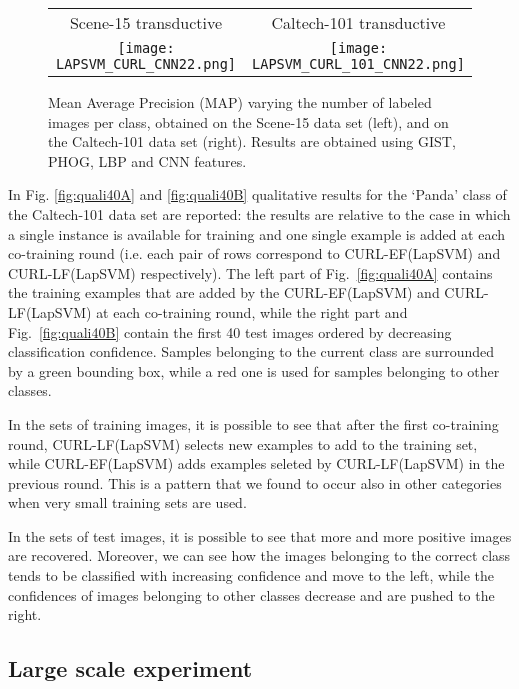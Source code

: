 \documentclass[journal,11pt]{IEEEtran}
\newcommand{\curllaplf}{CURL-LF(LapSVM)}
\newcommand{\curllapef}{CURL-EF(LapSVM)}
\begin{document}
\begin{figure*}[!htbp]%
\centering
\begin{tabular}{cc}
\footnotesize{Scene-15 transductive} & \footnotesize{Caltech-101 transductive}\\
\texttt{[image: LAPSVM\_CURL\_CNN22.png]} &
\texttt{[image: LAPSVM\_CURL\_101\_CNN22.png]} \\
\end{tabular}
\caption{Mean Average Precision (MAP) varying the number of labeled images per class, obtained on the Scene-15 data set (left), and on the Caltech-101 data set (right). Results are obtained using GIST, PHOG, LBP and CNN features.}%
\label{fig:curllap}%
\end{figure*}


In Fig. \ref{fig:quali40A} and \ref{fig:quali40B} %
qualitative results for the `Panda' class of the Caltech-101 data set are reported: the results are relative to the case in which a single instance is available for training and one single example is added at each co-training round (i.e. each pair of rows correspond to \curllapef{ }and \curllaplf{ }respectively). The left part of Fig.~\ref{fig:quali40A} contains the training examples that are added by the \curllapef{ }and \curllaplf{ }at each co-training round, while the right part and Fig.~\ref{fig:quali40B} contain the first 40 test images ordered by decreasing classification confidence. Samples belonging to the current class are surrounded by a green bounding box, while a red one is used for samples belonging to other classes.

In the sets of training images, it is possible to see that after the first co-training round, \curllaplf{ }selects new examples to add to the training set, while \curllapef{ }adds examples seleted by \curllaplf{ }in the previous round. This is a pattern that we found to occur also in other categories when very small training sets are used.

In the sets of test images, it is possible to see that more and more positive images are recovered. Moreover, we can see how the images belonging to the correct class tends to be classified with increasing confidence and move to the left, while the confidences of images belonging to other classes decrease and are pushed to the right.



\subsection{Large scale experiment}
\label{subsec:ilvsrc}
\end{document}
